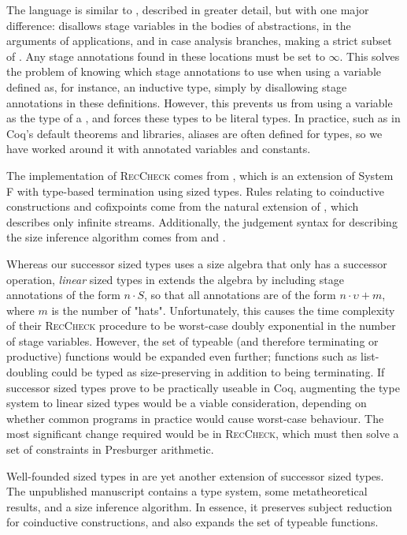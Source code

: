 \documentclass[acmsmall,nonacm,screen,review,anonymous,10pt]{acmart}
\begin{document}
The language \CIChatbar \cite{cic-hat-bar} is similar to \CIChat, described in greater detail, but with one major difference: \CIChatbar disallows stage variables in the bodies of abstractions, in the arguments of applications, and in case analysis branches, making \CIChatbar a strict subset of \CIChat. Any stage annotations found in these locations must be set to $\infty$. This solves the problem of knowing which stage annotations to use when using a variable defined as, for instance, an inductive type, simply by disallowing stage annotations in these definitions. However, this prevents us from using a variable as the \corecursive type of a \cofixpoint, and forces these types to be literal \coinductive types. In practice, such as in Coq's default theorems and libraries, aliases are often defined for \coinductive types, so we have worked around it with annotated variables and constants.

The implementation of \textsc{RecCheck} comes from \Fhat \cite{f-hat}, which is an extension of System F with type-based termination using sized types. Rules relating to coinductive constructions and cofixpoints come from the natural extension of \CChatomega \cite{cc-hat-omega}, which describes only infinite streams. Additionally, the judgement syntax for describing the size inference algorithm comes from \CChatomega and \CIChatl \cite{cic-hat-l}.

Whereas our successor sized types uses a size algebra that only has a successor operation, \textit{linear} sized types in \CIChatl extends the algebra by including stage annotations of the form $n \cdot S$, so that all annotations are of the form $n \cdot \upsilon + m$, where $m$ is the number of "hats". Unfortunately, this causes the time complexity of their \textsc{RecCheck} procedure to be worst-case doubly exponential in the number of stage variables. However, the set of typeable (and therefore terminating or productive) functions would be expanded even further; functions such as list-doubling could be typed as size-preserving in addition to being terminating. If successor sized types prove to be practically useable in Coq, augmenting the type system to linear sized types would be a viable consideration, depending on whether common programs in practice would cause worst-case behaviour. The most significant change required would be in \textsc{RecCheck}, which must then solve a set of constraints in Presburger arithmetic.

Well-founded sized types in \CIChatsub \cite{wellfounded} are yet another extension of successor sized types. The unpublished manuscript contains a type system, some metatheoretical results, and a size inference algorithm. In essence, it preserves subject reduction for coinductive constructions, and also expands the set of typeable functions.
\end{document}
